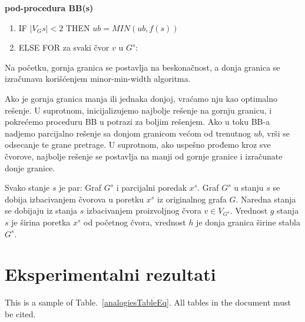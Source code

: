 \documentclass[10pt]{article}
\begin{document}
\textbf{pod-procedura BB(s)}
\begin{enumerate}
    \item IF $|V_Gs|<2$ THEN $ub = MIN(ub, f(s))$
    \item ELSE FOR za svaki čvor $v$ u $G^s$:
    \begin{enumerate}
    \item Napravi stanje $s' = ({G^s^'}, {x^s^'})$ gde je\\ ${G^s^'} = elim({G^s}, v)$ i  ${x^s^'} = (x^s, v).$
    \item $g({s^'}) = MAX(g(s), degree_{G^s}(v))$
    \item $h({s^'}) =$ \textbf{minor-min-width}($G^s^'})$
    \item $f({s^'}) = MAX(g({s^'}), h({s^'}))$
    \item If $f({s^'}) < ub$ onda $BB({s^'})$
    \end{enumerate}
\end{enumerate}

Na početku, gornja granica se postavlja na beskonačnost, a donja granica se izračunava korišćenjem minor-min-width algoritma.

Ako je gornja granica manja ili jednaka donjoj, vraćamo nju kao optimalno rešenje. U suprotnom, inicijalizujemo najbolje rešenje na gornju granicu, i pokrećemo proceduru BB u potrazi za boljim rešenjem. Ako u toku BB-a nadjemo parcijalno rešenje sa donjom granicom većom od trenutnog $ub$, vrši se odsecanje te grane pretrage. U suprotnom, ako uspešno prođemo kroz sve čvorove, najbolje rešenje se postavlja na manji od gornje granice i izračunate donje granice.

Svako stanje $s$ je par: Graf ${G^s}$ i parcijalni poredak ${x^s}$. Graf ${G^s}$ u stanju $s$ se dobija izbacivanjem čvorova u poretku ${x^s}$ iz originalnog grafa $G$. Naredna stanja se dobijaju iz stanja $s$ izbacivanjem proizvoljnog čvora $v \in V_{G^s}$. Vrednost $g$ stanja $s$ je širina poretka ${x^s}$ od početnog čvora, vrednost $h$ je donja granica širine stabla ${G^s}$.

\section{Eksperimentalni rezultati}


This is a sample of Table.~\ref{analogiesTableEq}. All tables in the document must be cited.
\end{document}
